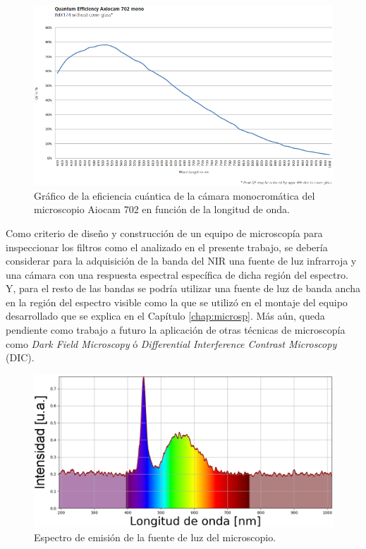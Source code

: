 \begin{figure}[H]
	\centering
	\includegraphics[width=1.0\textwidth]{Figs/defectosZEISS/eficienciacuanticacamarazeiss.png}
	\caption{Gráfico de la eficiencia cuántica de la cámara monocromática del microscopio Aiocam 702 en función de la longitud de onda.}
	\label{fig:eficienciacuanticamara}
\end{figure}
Como criterio de diseño y construcción de un equipo de microscopía para inspeccionar los filtros como el analizado en el presente trabajo, se debería considerar para la adquisición de la banda del NIR una fuente de luz infrarroja y una cámara con una respuesta espectral específica de dicha región del espectro. Y, para el resto de las bandas se podría utilizar una fuente de luz de banda ancha en la región del espectro visible como la que se utilizó en el montaje del equipo desarrollado que se explica en el Capítulo \ref{chap:microsp}. Más aún, queda pendiente como trabajo a futuro la aplicación de otras técnicas de microscopía como \textit{Dark Field Microscopy} ó \textit{Differential Interference Contrast Microscopy} (DIC).
\begin{figure}[H]
	\centering
	\includegraphics[width=1.0\textwidth]{Figs/defectosZEISS/espectrolampZEISSacolor.png}
	\caption{Espectro de emisión de la fuente de luz del microscopio.}
	\label{fig:espectrolamparazeiss}
\end{figure}

